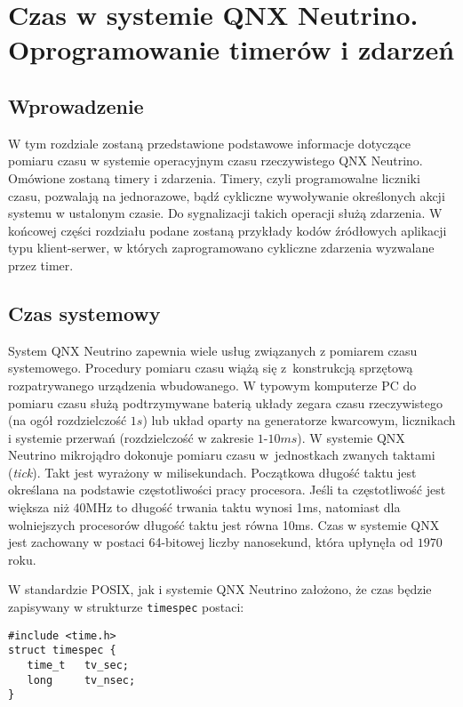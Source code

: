 \section{Czas w systemie QNX Neutrino. Oprogramowanie timerów i zdarzeń}

\subsection{Wprowadzenie}

W tym rozdziale zostaną przedstawione podstawowe informacje dotyczące pomiaru czasu w systemie operacyjnym czasu rzeczywistego QNX Neutrino. Omówione zostaną timery i zdarzenia. Timery, czyli programowalne liczniki czasu, pozwalają na jednorazowe, bądź cykliczne wywoływanie określonych akcji systemu w ustalonym czasie. Do sygnalizacji takich operacji służą zdarzenia. W końcowej części rozdziału podane zostaną przykłady kodów źródłowych aplikacji typu klient-serwer, w których zaprogramowano cykliczne zdarzenia wyzwalane przez timer.

\subsection{Czas systemowy}

System QNX Neutrino zapewnia wiele usług związanych z pomiarem czasu systemowego. Procedury pomiaru czasu wiążą się z~konstrukcją sprzętową rozpatrywanego urządzenia wbudowanego. W typowym komputerze PC do pomiaru czasu służą podtrzymywane baterią układy zegara czasu rzeczywistego (na ogół rozdzielczość $1s$) lub układ oparty na generatorze kwarcowym, licznikach i systemie przerwań (rozdzielczość w zakresie $1$-$10ms$). W systemie QNX Neutrino mikrojądro dokonuje pomiaru czasu w~jednostkach zwanych taktami (\emph{tick}). Takt jest wyrażony w milisekundach. Początkowa długość taktu jest określana na podstawie częstotliwości pracy procesora. Jeśli ta częstotliwość jest większa niż 40MHz to długość trwania taktu wynosi 1ms, natomiast dla wolniejszych procesorów długość taktu jest równa 10ms. Czas w systemie QNX jest zachowany w postaci 64-bitowej liczby nanosekund, która upłynęła od $1970$ roku.

W standardzie POSIX, jak i systemie QNX Neutrino założono, że czas będzie zapisywany w strukturze \lstinline[style=MyCStyle]{timespec} postaci:

\begin{lstlisting}[style=MyCStyle]
#include <time.h>
struct timespec {
   time_t   tv_sec;
   long     tv_nsec;
}
\end{lstlisting}


